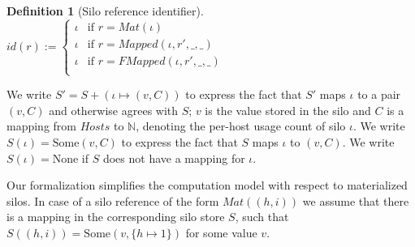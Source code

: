 \documentclass{article}
\theoremstyle{definition}
\newtheorem{defn}{Definition}[section]
\begin{document}
\begin{defn}[Silo reference identifier]
    $id(r) := \begin{cases}
    \iota  & \text{if } r = Mat(\iota) \\
    \iota  & \text{if } r = Mapped(\iota, r', \_, \_) \\
    \iota  & \text{if } r = FMapped(\iota, r', \_, \_) \\
    \end{cases}$
\end{defn}

\newpage

%
%


We write $S' = S + (\iota \mapsto (v, C))$ to express the fact that $S'$ maps $\iota$ to a pair $(v, C)$ and otherwise agrees with $S$; $v$ is the value stored in the silo and $C$ is a mapping from $Hosts$ to $\mathbb{N}$, denoting the per-host usage count of silo $\iota$. We write $S(\iota) = \text{Some}(v, C)$ to express the fact that $S$ maps $\iota$ to $(v, C)$. We write $S(\iota) = \text{None}$ if $S$ does not have a mapping for $\iota$. 

Our formalization simplifies the computation model with respect to
materialized silos. In case of a silo reference of the form $Mat((h, i))$
we assume that there is a mapping in the corresponding silo store $S$,
such that $S((h, i)) = \text{Some}(v, \{ h \mapsto 1 \})$ for some value $v$.
\end{document}
